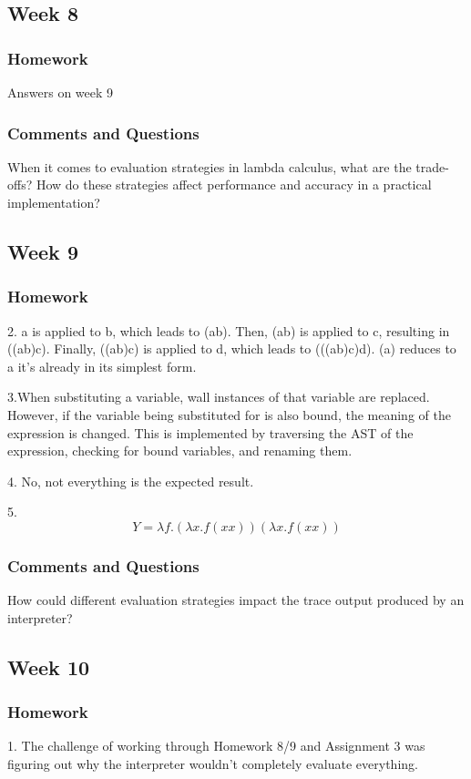 \documentclass{article}
\theoremstyle{theorem}
\theoremstyle{definition}
\theoremstyle{remark}
\begin{document}
\subsection{Week 8}
\subsubsection*{Homework}
Answers on week 9
\subsubsection*{Comments and Questions}
When it comes to evaluation strategies in lambda calculus, what are the trade-offs? How do these strategies affect performance and accuracy in a practical implementation?

\subsection{Week 9}
\subsubsection*{Homework}
2. a is applied to b, which leads to (ab). Then, (ab) is applied to c, resulting in ((ab)c). Finally, ((ab)c) is applied to d, which leads to (((ab)c)d). (a) reduces to a it's already in its simplest form.

3.When substituting a variable, wall instances of that variable are replaced. However, if the variable being substituted for is also bound, the meaning of the expression is changed. This is implemented by traversing the AST of the expression, checking for bound variables, and renaming them.

4. No, not everything is the expected result.

5. \[Y=\lambda f.(\lambda x.f(xx))(\lambda x.f(xx))\]

\subsubsection*{Comments and Questions}
How could different evaluation strategies impact the trace output produced by an interpreter?

\subsection{Week 10}
\subsubsection*{Homework}
1. The challenge of working through Homework 8/9 and Assignment 3 was figuring out why the interpreter wouldn't completely evaluate everything.
\end{document}
